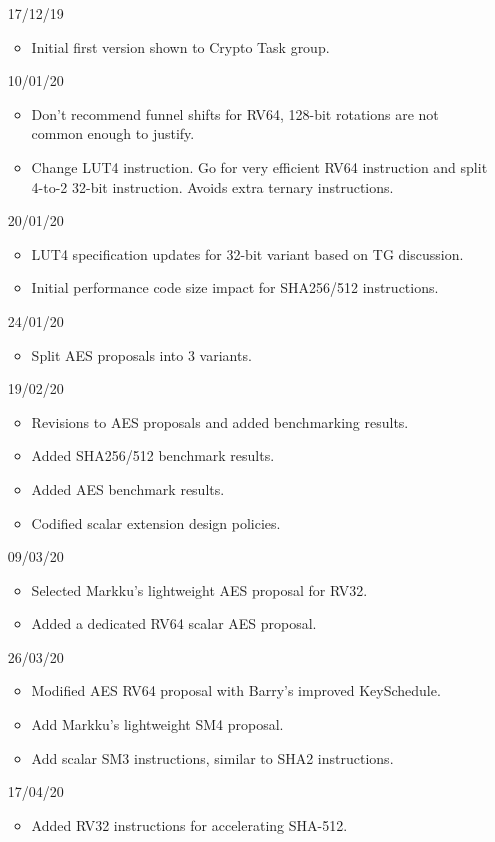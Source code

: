 
\begin{itemize}
\item[17/12/19] \begin{itemize}
    \item Initial first version shown to Crypto Task group.
\end{itemize}
\item[10/01/20] \begin{itemize}
    \item Don't recommend funnel shifts for RV64, 128-bit rotations
          are not common enough to justify.
    \item Change LUT4 instruction. Go for very efficient RV64 instruction
          and split 4-to-2 32-bit instruction.
          Avoids extra ternary instructions.
\end{itemize}
\item[20/01/20] \begin{itemize}
    \item LUT4 specification updates for 32-bit variant based on TG discussion.
    \item Initial performance code size impact for SHA256/512 instructions.
\end{itemize}
\item[24/01/20] \begin{itemize}
    \item Split AES proposals into 3 variants.
\end{itemize}
\item[19/02/20] \begin{itemize}
    \item Revisions to AES proposals and added benchmarking results.
    \item Added SHA256/512 benchmark results.
    \item Added AES        benchmark results.
    \item Codified scalar extension design policies.
\end{itemize}
\item[09/03/20] \begin{itemize}
    \item Selected Markku's lightweight AES proposal for RV32.
    \item Added a dedicated RV64 scalar AES proposal.
\end{itemize}
\item[26/03/20] \begin{itemize}
    \item Modified AES RV64 proposal with Barry's improved KeySchedule.
    \item Add Markku's lightweight SM4 proposal.
    \item Add scalar SM3 instructions, similar to SHA2 instructions.
\end{itemize}
\item[17/04/20] \begin{itemize}
    \item Added RV32 instructions for accelerating SHA-512.
\end{itemize}
\end{itemize}
